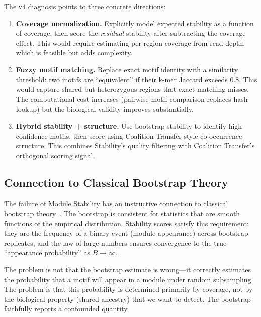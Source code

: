 \documentclass{../yalumba}
\begin{document}
The v4 diagnosis points to three concrete directions:

\begin{enumerate}
  \item \textbf{Coverage normalization.}  Explicitly model expected stability
    as a function of coverage, then score the \emph{residual} stability after
    subtracting the coverage effect.  This would require estimating per-region
    coverage from read depth, which is feasible but adds complexity.
  \item \textbf{Fuzzy motif matching.}  Replace exact motif identity with a
    similarity threshold: two motifs are ``equivalent'' if their k-mer Jaccard
    exceeds 0.8.  This would capture shared-but-heterozygous regions that
    exact matching misses.  The computational cost increases (pairwise motif
    comparison replaces hash lookup) but the biological validity improves
    substantially.
  \item \textbf{Hybrid stability + structure.}  Use bootstrap stability to
    identify high-confidence motifs, then score using Coalition Transfer-style
    co-occurrence structure.  This combines Stability's quality filtering with
    Coalition Transfer's orthogonal scoring signal.
\end{enumerate}

\subsection{Connection to Classical Bootstrap Theory}

The failure of Module Stability has an instructive connection to classical
bootstrap theory~\cite{hall1992bootstrap}.  The bootstrap is consistent for
statistics that are smooth functions of the empirical distribution.  Stability
scores satisfy this requirement: they are the frequency of a binary event
(module appearance) across bootstrap replicates, and the law of large numbers
ensures convergence to the true ``appearance probability'' as $B \to \infty$.


The problem is not that the bootstrap estimate is wrong---it correctly
estimates the probability that a motif will appear in a module under random
subsampling.  The problem is that this probability is determined primarily by
coverage, not by the biological property (shared ancestry) that we want to
detect.  The bootstrap faithfully reports a confounded quantity.
\end{document}
